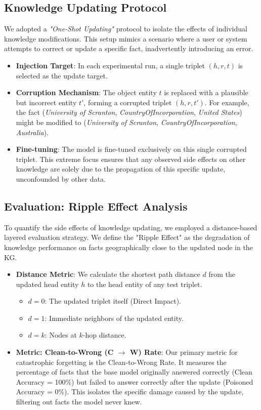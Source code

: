 \subsection{Knowledge Updating Protocol}
We adopted a \textit{"One-Shot Updating"} protocol to isolate the effects of individual knowledge modifications. This setup mimics a scenario where a user or system attempts to correct or update a specific fact, inadvertently introducing an error.

\begin{itemize}
    \item \textbf{Injection Target}: In each experimental run, a single triplet $(h, r, t)$ is selected as the update target.
    \item \textbf{Corruption Mechanism}: The object entity $t$ is replaced with a plausible but incorrect entity $t'$, forming a corrupted triplet $(h, r, t')$. For example, the fact (\textit{University of Scranton}, \textit{CountryOfIncorporation}, \textit{United States}) might be modified to (\textit{University of Scranton}, \textit{CountryOfIncorporation}, \textit{Australia}).
    \item \textbf{Fine-tuning}: The model is fine-tuned exclusively on this single corrupted triplet. This extreme focus ensures that any observed side effects on other knowledge are solely due to the propagation of this specific update, unconfounded by other data.
\end{itemize}

\subsection{Evaluation: Ripple Effect Analysis}
To quantify the side effects of knowledge updating, we employed a distance-based layered evaluation strategy. We define the "Ripple Effect" as the degradation of knowledge performance on facts geographically close to the updated node in the KG.

\begin{itemize}
    \item \textbf{Distance Metric}: We calculate the shortest path distance $d$ from the updated head entity $h$ to the head entity of any test triplet.
    \begin{itemize}
        \item $d=0$: The updated triplet itself (Direct Impact).
        \item $d=1$: Immediate neighbors of the updated entity.
        \item $d=k$: Nodes at $k$-hop distance.
    \end{itemize}
    \item \textbf{Metric: Clean-to-Wrong (C $\rightarrow$ W) Rate}: Our primary metric for catastrophic forgetting is the Clean-to-Wrong Rate. It measures the percentage of facts that the base model originally answered correctly (Clean Accuracy = 100\%) but failed to answer correctly after the update (Poisoned Accuracy = 0\%). This isolates the specific damage caused by the update, filtering out facts the model never knew.
\end{itemize}
